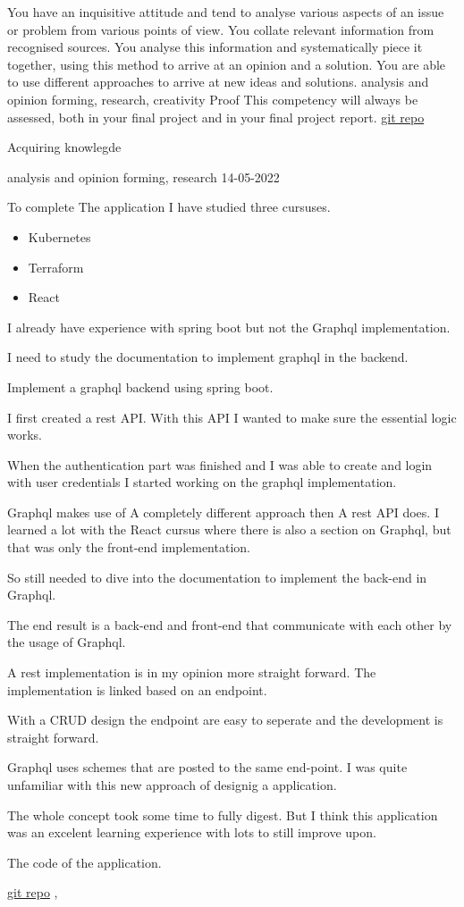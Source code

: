 \competentie
{%
	\competentieformulier
	{%
		You have an inquisitive attitude and tend to analyse various aspects of an issue or problem from various points of view. You collate relevant information from recognised sources. You analyse this information and systematically piece it together, using this method to arrive at an opinion and a solution. You are able to use different approaches to arrive at new ideas and solutions.
	}
	{%
		analysis and opinion forming,%
		research,%
		creativity%
	}
	{%
		Proof
	}
	{%
		This competency will always be assessed, both in your final project and in your final project report.
	}
	{%
		\href{https://github.com/aladante/product_inventaris}{git repo}
	}
}
{%
	\bewijs
	{%
		Acquiring knowlegde
	}
	{%
		\starr
		{%
			analysis and opinion forming,
			research
		}
		{%
			14-05-2022
		}
		{%
			To complete The application I have studied three cursuses.
			\begin{itemize}
				\item Kubernetes
				\item Terraform
				\item React
			\end{itemize}

			I already have experience with spring boot but not the Graphql implementation.

			I need to study the documentation to implement graphql in the backend.
		}
		{%
			Implement a graphql backend using spring boot.
		}
		{%
			I first created a rest API. With this API I wanted to make sure the essential logic works.

			When the authentication part was finished and I was able to create and login with user credentials I started working on the graphql implementation.

			Graphql makes use of A completely different approach then A rest API does.
			I learned a lot with the React cursus where there is also a section on Graphql, but that was only the front-end implementation.

			So still needed to dive into the documentation to implement the back-end in Graphql.

		}
		{%
			The end result is a back-end and front-end that communicate with each other by the usage of Graphql.
		}
		{%
			A rest implementation is in my opinion more straight forward.
			The implementation is linked based on an endpoint.

			With a CRUD design the endpoint are easy to seperate and the development is straight forward.

			Graphql uses schemes that are posted to the same end-point.
			I was quite unfamiliar with this new approach of designig a application.

			The whole concept took some time to fully digest.
			But I think this application was an excelent learning experience with lots to still improve upon.

		}
		{
			The code of the application.
		}
	}
	{%
		\href{https://github.com/aladante/product_inventaris}{git repo}
	},
}
